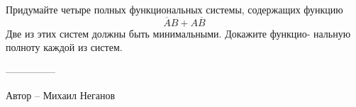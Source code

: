 \question
Придумайте четыре полных функциональных системы, содержащих функцию
\[
\overline{A}B + A\overline{B}
\]
Две из этих систем должны быть минимальными. Докажите функцио-
нальную полноту каждой из систем.

---------------

Автор -- Михаил Неганов